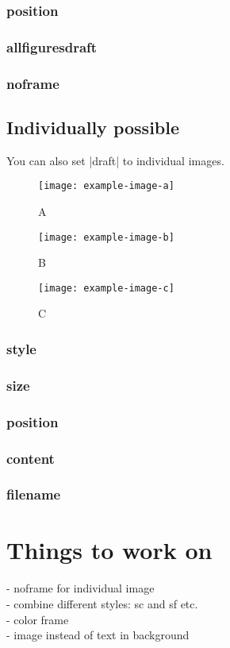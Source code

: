 \documentclass[a4paper,
12pt,
english
]{ltxdoc}
\begin{document}
\subsubsection{position}

\subsubsection{allfiguresdraft}


\subsubsection{noframe}

\clearpage
\subsection{Individually possible}

You can also set |draft| to individual images.
\begin{codeexample}
\begin{figure}[H]
  \centering
  \texttt{[image: example-image-a]}
  \caption{A}
  \texttt{[image: example-image-b]}
  \caption{B}
  \texttt{[image: example-image-c]}
  \caption{C}
\end{figure}
\end{codeexample}

\subsubsection{style}

\subsubsection{size}

\subsubsection{position}

\subsubsection{content}

\subsubsection{filename}

\clearpage

\section{Things to work on}

- noframe for individual image\\
- combine different styles: sc and sf etc.\\
- color frame\\
- image instead of text in background\\
\end{document}
